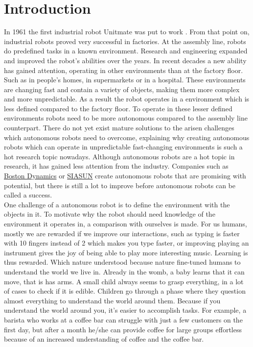 \chapter{Introduction}
\label{chapter: introduction}
In 1961 the first industrial robot Unitmate was put to work \cite{noauthor_unimate_2022}. From that point on, industrial robots proved very successful in factories. At the assembly line, robots do predefined tasks in a known environment. Research and engineering expanded and improved the robot's abilities over the years. In recent decades a new ability has gained attention, operating in other environments than at the factory floor. Such as in people's homes, in supermarkets or in a hospital. These environments are changing fast and contain a variety of objects, making them more complex and more unpredictable. As a result the robot operates in a environment which is less defined compared to the factory floor. To operate in these lesser defined environments robots need to be more autonomous compared to the assembly line counterpart. There do not yet exist mature solutions to the arisen challenges which autonomous robots need to overcome, explaining why creating autonomous robots which can operate in unpredictable fast-changing environments is such a hot research topic nowadays. Although autonomous robots are a hot topic in research, it has gained less attention from the industry. Companies such as \href{https://www.bostondynamics.com/}{Boston Dynamics} or \href{http://www.siasun.com/index.php?m=content&c=index&a=initsa}{SIASUN} 
create autonomous robots that are promising with potential, but there is still a lot to improve before autonomous robots can be called a success. \\

One challenge of a autonomous robot is to define the environment with the objects in it. To motivate why the robot should need knowledge of the environment it operates in, a comparison with ourselves is made. For us humans, mostly we are rewarded if we improve our interactions, such as typing is faster with 10 fingers instead of 2 which makes you type faster, or improving playing an instrument gives the joy of being able to play more interesting music. Learning is thus rewarded. Which nature understood  because nature fine-tuned humans to understand the world we live in. Already in the womb, a baby learns that it can move, that is has arms. A small child always seems to grasp everything, in a lot of cases to check if it is edible. Children go through a phase where they question almost everything to understand the world around them. Because if you understand the world around you, it's easier to accomplish tasks. For example, a barista who works at a coffee bar can struggle with just a few customers on the first day, but after a month he/she can provide coffee for large groups effortless because of an increased understanding of coffee and the coffee bar. \\

